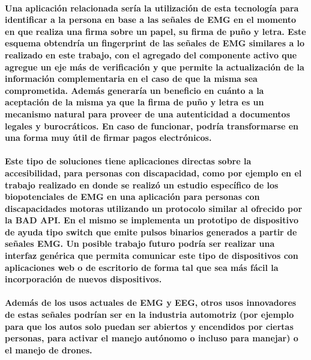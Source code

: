 \documentclass{article}
\begin{document}
\paragraph{
Una aplicación relacionada sería la utilización de esta tecnología para identificar a la persona en base a las señales de EMG en el momento en que realiza una firma sobre un papel, su firma de puño y letra.  Este esquema obtendría un fingerprint de las señales de EMG similares a lo realizado en este trabajo, con el agregado del componente activo que agregue un eje más de verificación y que permite la actualización de la información complementaria en el caso de que la misma sea comprometida.  Además generaría un beneficio en cuánto a la aceptación de la misma ya que la firma de puño y letra es un mecanismo natural para proveer de una autenticidad a documentos legales y burocráticos. En caso de funcionar, podría transformarse en una forma muy útil de firmar pagos electrónicos.
}

\paragraph{
Este tipo de soluciones tiene aplicaciones directas sobre la accesibilidad, para personas con discapacidad, como por ejemplo en el trabajo realizado en \cite{haberman2016} donde se realizó un estudio específico de los biopotenciales de EMG en una aplicación para personas con discapacidades motoras utilizando un protocolo similar al ofrecido por la BAD API. En el mismo se implementa un prototipo de dispositivo de ayuda tipo switch que emite pulsos binarios generados a partir de señales EMG. Un posible trabajo futuro podría ser realizar una interfaz genérica que permita comunicar este tipo de dispositivos con aplicaciones web o de escritorio de forma tal que sea más fácil la incorporación de nuevos dispositivos.
}

\paragraph{
Además de los usos actuales de EMG y EEG, otros usos innovadores de estas señales podrían ser en la industria automotriz (por ejemplo para que los autos solo puedan ser abiertos y encendidos por ciertas personas, para activar el manejo autónomo o incluso para manejar) o el manejo de drones.
}



\clearpage
\nocite{opinnovationswebsite}
\nocite{charbit2017}
\nocite{bressert2012}
\nocite{angkoon2009}
\nocite{oliphant2015}
\nocite{langtangen2016}
\nocite{hassanien2015}
\nocite{moonwon2016}
\nocite{sharma2016}
\nocite{trewin}
\nocite{chowdhury2013}
\nocite{siqueira2015}
\nocite{samsung2016}
\nocite{raez2006}
\nocite{esparza2017}
\nocite{sanei2007}
\nocite{haberman2016}

\printbibliography[heading=bibintoc,title={Bibliografía}]
\end{document}
